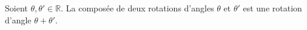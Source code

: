 Soient $\theta, \theta'\in\mathbb R$. La composée de deux rotations d'angles $\theta$ et $\theta'$ est une rotation d'angle $\theta+\theta'$.

\begin{reponses}
\end{reponses}

